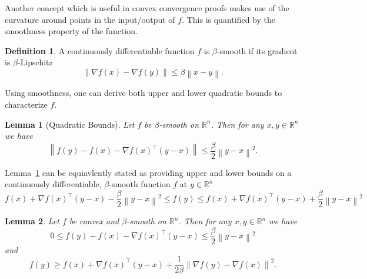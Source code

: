 \documentclass{article}
\newcommand{\R}{\mathbb R}
\newcommand{\norm}[1]{\left\| #1 \right\| }
\newtheorem{lemma}{Lemma}
\theoremstyle{definition}
\newtheorem{definition}{Definition}
\begin{document}
Another concept which is useful in convex convergence proofs makes use of the
curvature around points in the input/output of $f$. This is quantified by the
smoothness property of the function.

\begin{definition}
    A continuously differentiable function $f$ is $\beta$-smooth if its gradient
    is $\beta$-Lipschitz
    \begin{equation}
        \norm{\nabla f(x) - \nabla f(y)} \leq \beta \norm{x - y}.
    \end{equation}
\end{definition}

Using smoothness, one can derive both upper and lower quadratic bounds to
characterize $f$. 

\begin{lemma}[Quadratic Bounds]
    \label{lem:quadratic_bounds}
    Let $f$ be $\beta$-smooth on $\R^n$. Then for any $x, y \in \R^n$ we have 
    \begin{equation}
        \norm{f(y) - f(x) - \nabla {f(x)}^\intercal(y - x)} \leq \frac{\beta}{2}
        \norm{y - x}^2.
    \end{equation}
\end{lemma}

Lemma~\ref{lem:quadratic_bounds} can be equiavlently stated as providing upper
and lower bounds on a continuously differentiable, $\beta$-smooth function $f$
at $y \in \R^n$
\begin{equation}
    f(x) + \nabla {f(x)}^\intercal(y - x) - \frac{\beta}{2} \norm{y - x}^2 \leq
    f(y) \leq
    f(x) + \nabla {f(x)}^\intercal(y - x) + \frac{\beta}{2} \norm{y - x}^2
\end{equation}

\begin{lemma}
    \label{lem:con_smo}
    Let $f$ be convex and $\beta$-smooth on $\R^n$. Then for any $x, y \in \R^n$ we have
    \begin{equation}
        \label{eq:lem4_1}
        0 \leq f(y) - f(x) - \nabla {f(x)}^\intercal (y - x) \leq
        \frac{\beta}{2} \norm{y - x}^2
    \end{equation}
    and
    \begin{equation}
        \label{eq:lem4_2}
        f(y) \geq f(x) + \nabla {f(x)}^\intercal (y - x) + \frac{1}{2\beta}
        \norm{\nabla f(y) - \nabla f(x)}^2.
    \end{equation}
\end{lemma}
\end{document}
